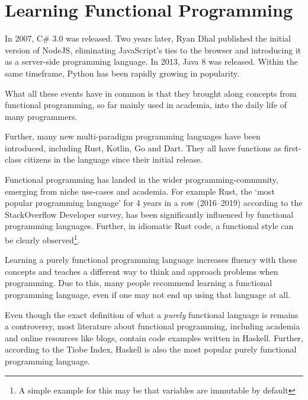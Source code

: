 
\section{Learning Functional Programming}

In 2007, C\# 3.0 was released. Two years later, Ryan Dhal published the initial version
of NodeJS, eliminating JavaScript's ties to the browser and introducing it as a server-side
programming language. In 2013, Java 8 was released. Within the same timeframe, Python
has been rapidly growing in popularity\autocite{python-popularity}.

What all these events have in common is that they brought along concepts from functional
programming, so far mainly used in academia, into the daily life of many programmers.

Further, many new multi-paradigm programming languages have been introduced,
including Rust, Kotlin, Go and Dart. They all have functions as first-class citizens in
the language since their initial release.

Functional programming has landed in the wider programming-community, emerging from niche use-cases
and academia.
For example Rust, the `most popular programming language' for 4 years in a row (2016--2019)
according to the StackOverflow Developer survey\autocite{rust-loved}, has been significantly
influenced by functional programming languages\autocite{rust-functional}. Further, in idiomatic
Rust code, a functional style can be clearly observed\footnote{A simple example for this may be
that variables are immutable by default}.

Learning a purely functional programming language increases fluency with these concepts and
teaches a different way to think and approach problems when programming. Due to this, many
people recommend learning a functional programming
language\autocite{blog1-funcprog}\autocite{blog2-funcprog}\autocite{blog3-funcprog}\autocite{blog4-funcprog},
even if one may not end up using that language at all\autocite{quora-funcprog}.

Even though the exact definition of what a \textit{purely} functional language is remains a
controversy\autocite{functional-controversy}, most literature about functional programming,
including academia and online resources like blogs, contain code examples written in Haskell.
Further, according to the Tiobe Index\autocite{tiobe-index}, Haskell is also the most popular
purely functional programming language\autocite{comparison-functional-languages}.

